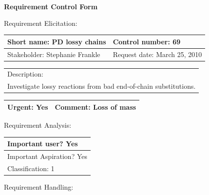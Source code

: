 \begin{center}\Large\bf
Requirement Control Form
\end{center}
\vspace{24pt}

Requirement Elicitation:

\begin{tabular}{|p{211pt}|p{211pt}|} \hline
Short name: PD lossy chains & Control number: 69\\ \hline
Stakeholder: Stephanie Frankle & Request date: March 25, 2010\\
\end{tabular}
\begin{tabular}{|p{433pt}|} \hline
Description: \\ 
Investigate lossy reactions from bad end-of-chain substitutions.
\\ \hline
\end{tabular} 
\begin{tabular}{|p{211pt}|p{211pt}|} \hline
Urgent: Yes & Comment: Loss of mass
\\ \hline
\end{tabular}

\vspace{24pt}

Requirement Analysis:

\begin{tabular}{|p{433pt}|} \hline
Important user? Yes \\ \hline
Important Aspiration? Yes \\ \hline
Classification: 1 \\ \hline
\end{tabular}
\vspace{24pt}

Requirement Handling:

